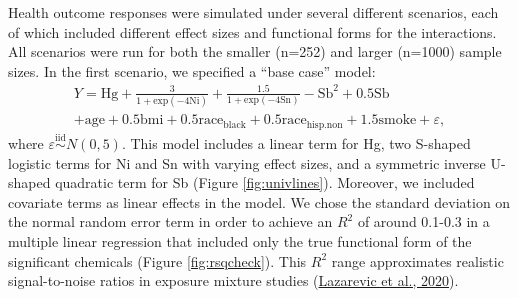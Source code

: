 \documentclass[12pt, twoside]{amherstthesis}
\begin{document}
Health outcome responses were simulated under several different scenarios, each of which included different effect sizes and functional forms for the interactions. All scenarios were run for both the smaller (n=252) and larger (n=1000) sample sizes. In the first scenario, we specified a ``base case'' model:
\begin{multline*}
Y = \textrm{Hg} + \frac{3}{1+\textrm{exp}(-4\textrm{Ni})} + \frac{1.5}{1+\textrm{exp}(-4\textrm{Sn})} - \textrm{Sb}^2 + 0.5\textrm{Sb}\\
+ \textrm{age} + 0.5\textrm{bmi} + 0.5\textrm{race}_{\textrm{black}} + 0.5\textrm{race}_{\textrm{hisp.non}} + 1.5\textrm{smoke} + \varepsilon,
\end{multline*}
\noindent where \(\varepsilon \overset{\mathrm{iid}}{\sim} N(0,5)\). This model includes a linear term for Hg, two S-shaped logistic terms for Ni and Sn with varying effect sizes, and a symmetric inverse U-shaped quadratic term for Sb (Figure \ref{fig:univlines}). Moreover, we included covariate terms as linear effects in the model. We chose the standard deviation on the normal random error term in order to achieve an \(R^2\) of around 0.1-0.3 in a multiple linear regression that included only the true functional form of the significant chemicals (Figure \ref{fig:rsqcheck}). This \(R^2\) range approximates realistic signal-to-noise ratios in exposure mixture studies (\protect\hyperlink{ref-lazarevic_performance_2020}{Lazarevic et al., 2020}).
\end{document}
